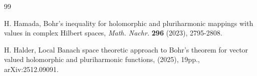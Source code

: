 \documentclass[a4paper,11pt, reqno]{amsart}
\theoremstyle{definition}
\begin{document}
\begin{thebibliography}{99}
	
	
	
	
	
	
	
	
	
	 {\sc H. Hamada},  Bohr's inequality for holomorphic and pluriharmonic mappings with values in complex Hilbert spaces, {\it Math. Nachr.} {\bf 296} (2023), 2795-2808.
	
	
	
	 {\sc H. Halder}, Local Banach space theoretic approach to Bohr's theorem for vector valued holomorphic and pluriharmonic functions, (2025), 19pp., arXiv:2512.09091.
	

\end{thebibliography}
\end{document}
